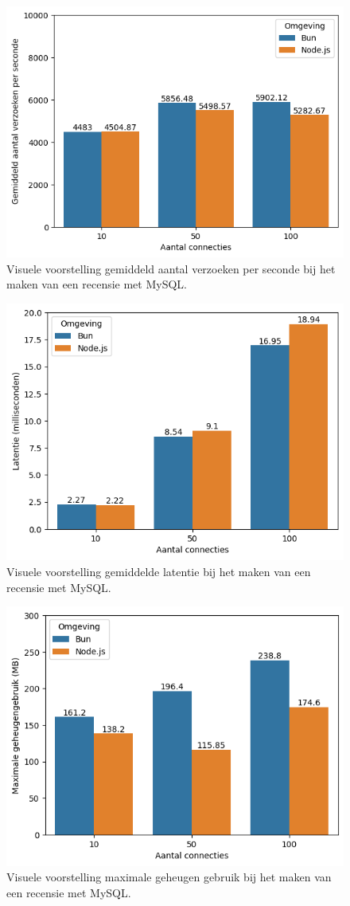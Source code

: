     \begin{figure}[H]
      \centering
      \includegraphics[width=0.7\columnwidth]{graphics/PostMySqlVerzoeken.png}
      \caption[Aantal verzoeken per seconde POST verzoek met MySQL]{\label{fig:postaantalverzoekenmysql}Visuele voorstelling gemiddeld aantal verzoeken per seconde bij het maken van een recensie met MySQL.}
    \end{figure}
    \begin{figure}[H]
      \centering
      \includegraphics[width=0.7\columnwidth]{graphics/PostMySqlLatentie.png}
      \caption[Latentie POST verzoek met MySQL]{\label{fig:postaantallatentienmysql}Visuele voorstelling gemiddelde latentie bij het maken van een recensie met MySQL.}
    \end{figure}
    \begin{figure}[H]
      \centering
      \includegraphics[width=0.7\columnwidth]{graphics/PostMySqlRAM.png}
      \caption[Geheugengebruik POST verzoek met MySQL]{\label{fig:postgeheugenmysql}Visuele voorstelling maximale geheugen gebruik bij het maken van een recensie met MySQL.}
    \end{figure}
